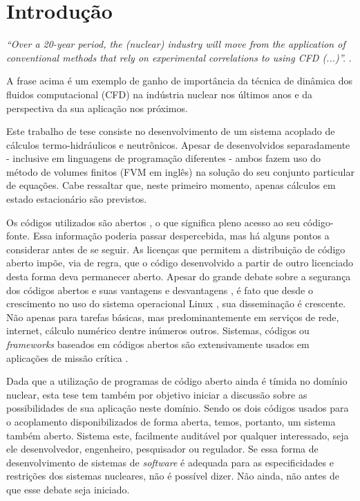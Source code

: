 \chapter{Introdução}
\label{chap:introducao}

\emph{``Over a 20-year period, the (nuclear) industry will move from 
the application of conventional methods that rely on 
experimental correlations to using CFD (...)''.} \cite[p.~655]{Baglietto2011}.

A frase acima é um exemplo de ganho de importância da técnica de dinâmica dos fluidos 
computacional (CFD) na indústria nuclear nos últimos anos e da perspectiva da sua aplicação 
nos próximos.  

Este trabalho de tese consiste no desenvolvimento de um sistema acoplado de cálculos
termo-hidráulicos e neutrônicos. Apesar de desenvolvidos separadamente - inclusive
em linguagens de programação diferentes - ambos fazem uso do método de volumes
finitos \cite{Eymard2003} (FVM em inglês) na solução do seu conjunto particular de equações.
Cabe ressaltar que, neste primeiro momento, apenas cálculos em estado estacionário
são previstos.

Os códigos utilizados são abertos \cite[Capítulo~3]{Stallman2002}, o que significa pleno acesso ao seu código-fonte.
Essa informação poderia passar despercebida, mas há alguns pontos a considerar antes de se
seguir. As licenças que permitem a distribuição de código aberto impõe, via de regra, que
o código desenvolvido a partir de outro licenciado desta forma deva permanecer aberto.
Apesar do grande debate sobre a segurança dos códigos abertos e suas vantagens e desvantagens \cite[Seção~2.6]{Androutsellis2010},
é fato que desde o crescimento no uso do sistema operacional Linux \cite{LinuxBritannica}, sua disseminação é crescente.
Não apenas para tarefas básicas, mas predominantemente em serviços de rede, internet, cálculo numérico dentre
inúmeros outros. Sistemas, códigos ou \textit{frameworks} baseados em códigos abertos são
extensivamente usados em aplicações de missão crítica \cite{Norris2004}.

Dada que a utilização de programas de código aberto ainda é tímida no domínio nuclear,
esta tese tem também por objetivo iniciar a discussão sobre as possibilidades de sua
aplicação neste domínio. Sendo os dois códigos usados para o acoplamento disponibilizados
de forma aberta, temos, portanto, um sistema também aberto. Sistema este, facilmente auditável
por qualquer interessado, seja ele desenvolvedor, engenheiro, pesquisador ou regulador.
Se essa forma de desenvolvimento de sistemas de \textit{software} é adequada para as especificidades
e restrições dos sistemas nucleares, não é possível dizer. Não ainda, não antes de que esse debate
seja iniciado.

